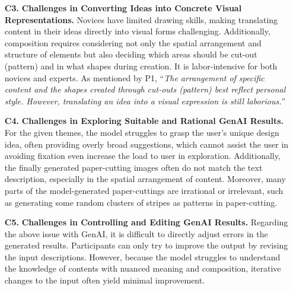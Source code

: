 \begin{itemize}
\item[\textbf{C3.}] \textbf{Challenges in Converting Ideas into Concrete Visual Representations.}
Novices have limited drawing skills, making translating content in their ideas directly into visual forms challenging. Additionally, composition requires considering not only the spatial arrangement and structure of elements but also deciding which areas should be cut-out (pattern) and in what shapes during creation. It is labor-intensive for both novices and experts. As mentioned by P1, ``\textit{The arrangement of specific content and the shapes created through cut-outs (pattern) best reflect personal style. However, translating an idea into a visual expression is still laborious.}''

\item[\textbf{C4.}] \textbf{Challenges in Exploring Suitable and Rational GenAI Results.} 
For the given themes, the model struggles to grasp the user's unique design idea, often providing overly broad suggestions, which cannot assist the user in avoiding fixation even increase the load to user in exploration. Additionally, the finally generated paper-cutting images often do not match the text description, especially in the spatial arrangement of content. Moreover, many parts of the model-generated paper-cuttings are irrational or irrelevant, such as generating some random clusters of stripes as patterns in paper-cutting.

\item[\textbf{C5.}] \textbf{Challenges in Controlling and Editing GenAI Results.} 
Regarding the above issue with GenAI, it is difficult to directly adjust errors in the generated results. Participants can only try to improve the output by revising the input descriptions. However, because the model struggles to understand the knowledge of contents with nuanced meaning and composition, iterative changes to the input often yield minimal improvement.

\end{itemize}


